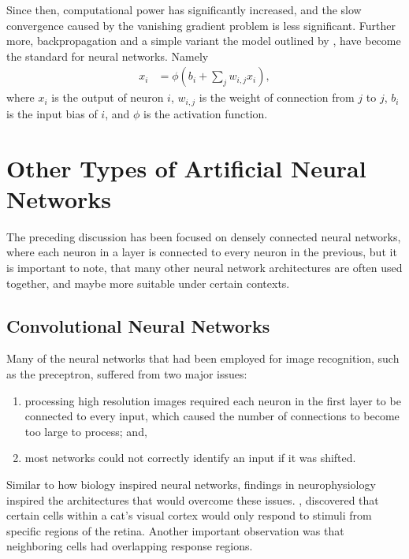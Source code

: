 Since then, computational power has significantly increased, and the slow
convergence caused by the vanishing gradient problem is less significant.
Further more, backpropagation and a simple variant the model outlined by
\cite{McClelland:1986:Parallel}, have become the standard for neural networks.
Namely
\begin{align*}
    x_i &= \phi\left(b_i + \sum_j w_{i,j} x_i\right),
\end{align*}
where $x_i$ is the output of neuron $i$, $w_{i,j}$ is the weight of connection
from $j$ to $j$, $b_i$ is the input bias of $i$, and $\phi$ is the activation
function.




\section{Other Types of Artificial Neural Networks}

The preceding discussion has been focused on densely connected neural
networks, where each neuron in a layer is connected to every neuron in the
previous, but it is important to note, that many other neural network
architectures are often used together, and maybe more suitable under certain
contexts.




\subsection{Convolutional Neural Networks}

Many of the neural networks that had been employed for image recognition, such
as the preceptron, suffered from two major issues:
\begin{enumerate}
    \item processing high resolution images required each neuron in the first
        layer to be connected to every input, which caused the number of
        connections to become too large to process; and,
    \item most networks could not correctly identify an input if it was shifted.
\end{enumerate}
Similar to how biology inspired neural networks, findings in neurophysiology
inspired the architectures that would overcome these issues.
\cite{Hubel:1959:Receptive}, discovered that certain cells within a cat's
visual cortex would only respond to stimuli from specific regions of the retina.
Another important observation was that neighboring cells had overlapping
response regions.


